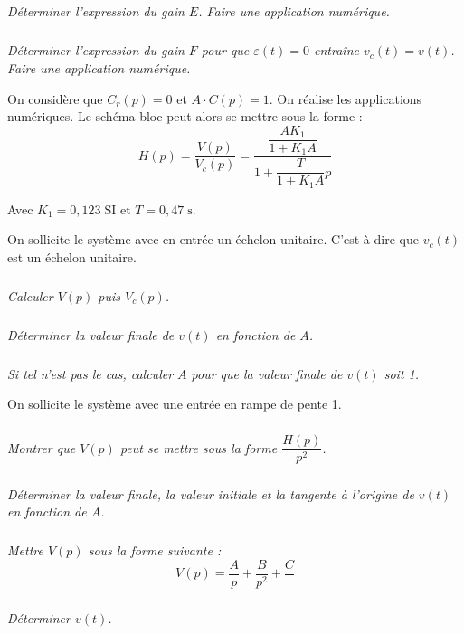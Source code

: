 \documentclass[10pt]{article}
\newif\ifprof
\begin{document}
\subparagraph{}
\textit{Déterminer l’expression du gain $E$. Faire une application numérique.}
\ifprof
\begin{corrige}
\end{corrige}
\else
\fi



\subparagraph{}
\textit{Déterminer l’expression du gain $F$ pour que $\varepsilon (t)=0$ entraîne $v_c(t)=v(t)$. Faire une application numérique.}
\ifprof
\begin{corrige}
\end{corrige}
\else
\fi


On considère que $C_r (p)=0$ et $A\cdot C(p)=1$. On réalise les applications numériques. Le schéma bloc peut alors se mettre sous la forme : 
$$
H(p)=\dfrac{V(p)}{V_c (p)}= \dfrac{\dfrac{AK_1}{1+K_1A}}{1+\dfrac{T}{1+K_1A} p}
$$

Avec 
$K_1=0,123 \;\text{SI}$ et $T=0,47\;\text{s}$.

On sollicite le système avec en entrée un échelon unitaire. C’est-à-dire que $v_c(t)$ est un échelon unitaire. 


\subparagraph{}
\textit{Calculer $V(p)$ puis $V_c (p)$. }
\ifprof
\begin{corrige}
\end{corrige}
\else
\fi



\subparagraph{}
\textit{Déterminer la valeur finale de $v(t)$ en fonction de $A$. }
\ifprof
\begin{corrige}
\end{corrige}
\else
\fi



\subparagraph{}
\textit{Si tel n’est pas le cas, calculer $A$ pour que la valeur finale de $v(t)$ soit 1.}
\ifprof
\begin{corrige}
\end{corrige}
\else
\fi

On sollicite le système avec une entrée en rampe de pente 1. 

\subparagraph{}
\textit{Montrer que $V(p)$ peut se mettre sous la forme $\dfrac{H(p)}{p^2}$. }
\ifprof
\begin{corrige}
\end{corrige}
\else
\fi



\subparagraph{}
\textit{Déterminer la valeur finale, la valeur initiale et la tangente à l’origine de $v(t)$ en fonction de $A$.}
\ifprof
\begin{corrige}
\end{corrige}
\else
\fi


\subparagraph{}
\textit{Mettre $V(p)$ sous la forme suivante : }
$$
V(p)=\dfrac{A}{p}+\dfrac{B}{p^2} +\dfrac{C}{}
$$

\ifprof
\begin{corrige}
\end{corrige}
\else
\fi



\subparagraph{}
\textit{Déterminer $v(t)$.}
\ifprof
\begin{corrige}
\end{corrige}
\else
\fi
\end{document}
